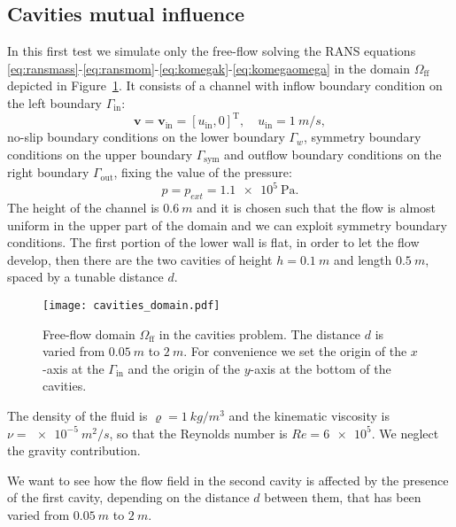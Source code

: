 \subsection{Cavities mutual influence}
In this first test we simulate only the free-flow solving the RANS equations  \eqref{eq:ransmass}-\eqref{eq:ransmom}-\eqref{eq:komegak}-\eqref{eq:komegaomega} in the domain $\Omega_\text{ff}$ depicted in Figure~\ref{fig:singledomain}. It consists of a channel with inflow boundary 
condition on the left boundary $\Gamma_\text{in}$:
\begin{equation}
	\mathbf{v} = \mathbf{v}_\text{in} = [u_\text{in}, 0]^\mathrm{T}, \quad u_\text{in} = \SI{1}{m/s},
\end{equation}
no-slip boundary conditions on the lower boundary $\Gamma_w$, symmetry boundary conditions on the upper boundary $\Gamma_\text{sym}$ and outflow boundary conditions on the right boundary $\Gamma_\text{out}$, fixing the value of the pressure:
\begin{equation}
	p = p_{ext} = \SI{1.1e5}{\pascal}.
\end{equation}
The height of the channel is $\SI{0.6}{m}$ and it is chosen such that the flow is almost uniform in the upper part of the domain and we can exploit symmetry boundary conditions. The first portion of the lower wall is flat, in order to let the flow develop, then there are the two cavities of height $h=\SI{0.1}{m}$ and length $\SI{0.5}{m}$, spaced by a tunable distance $d$.
\begin{figure}[ht]
	\centering
	\texttt{[image: cavities\_domain.pdf]}
	\caption[Free-flow domain $\Omega_\text{ff}$ in the cavities problem]{Free-flow domain $\Omega_\text{ff}$ in the cavities problem. The distance $d$ is varied from $\SI{0.05}{m}$ to $\SI{2}{m}$. For convenience we set the origin of the $x$-axis at the $\Gamma_\text{in}$ and the origin of the $y$-axis at the bottom of the cavities.}
	\label{fig:singledomain}
\end{figure}
The density of the fluid is $\varrho = \SI{1}{kg/m^3}$ and the kinematic viscosity is $\nu=\SI{e-5}{m^2/s}$, so that the Reynolds number is $Re=\num{6e5}$. We neglect the gravity contribution.

We want to see how the flow field in the second cavity is affected by the 
presence of the first cavity, depending on the distance $d$ between them, that 
has been varied from $\SI{0.05}{m}$ to $\SI{2}{m}$.

